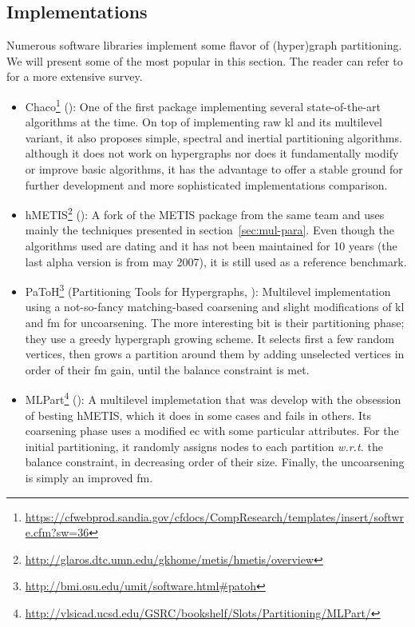 \documentclass[11pt,a4paper]{report} %
\theoremstyle{customdef}
\begin{document}
\subsection{Implementations}\label{sec:impl}
Numerous software libraries implement some flavor of (hyper)graph partitioning.
We will present some of the most popular in this section.
The reader can refer to~\citep{Trifunovic2006} for a more extensive survey.
\begin{itemize}
	\item Chaco\footnote{\url{https://cfwebprod.sandia.gov/cfdocs/CompResearch/templates/insert/softwre.cfm?sw=36}} (\citet{Hendrickson1994}): One of the first package implementing several state-of-the-art algorithms at the time.
	On top of implementing raw \gls{kl} and its multilevel variant, it also proposes simple, spectral and inertial partitioning algorithms.
	although it does not work on hypergraphs nor does it fundamentally modify or improve basic algorithms, it has the advantage to offer a stable ground for further development and more sophisticated implementations comparison.

	\item hMETIS\footnote{\url{http://glaros.dtc.umn.edu/gkhome/metis/hmetis/overview}} (\citet{Karypis1999}): A fork of the METIS package from the same team and uses mainly the techniques presented in section~\ref{sec:mul-para}.
	Even though the algorithms used are dating and it has not been maintained for 10 years (the last alpha version is from may 2007), it is still used as a reference benchmark.

	\item PaToH\footnote{\url{http://bmi.osu.edu/umit/software.html\#patoh}} (Partitioning Tools for Hypergraphs, \citet{Aykanat2011}): Multilevel implementation using a not-so-fancy matching-based coarsening and slight modifications of \gls{kl} and \gls{fm} for uncoarsening.
	The more interesting bit is their partitioning phase; they use a greedy hypergraph growing scheme.
	It selects first a few random vertices, then grows a partition around them by adding unselected vertices in order of their \gls{fm} gain, until the balance constraint is met.

	\item MLPart\footnote{\url{http://vlsicad.ucsd.edu/GSRC/bookshelf/Slots/Partitioning/MLPart/}} (\citet{Caldwell2000}): A multilevel implemetation that was develop with the obsession of besting hMETIS, which it does in some cases and fails in others.
	Its coarsening phase uses a modified \gls{ec} with some particular attributes.
	For the initial partitioning, it randomly assigns nodes to each partition \textit{w.r.t.} the balance constraint, in decreasing order of their size.
	Finally, the uncoarsening is simply an improved \gls{fm}.


\end{itemize}
\end{document}
